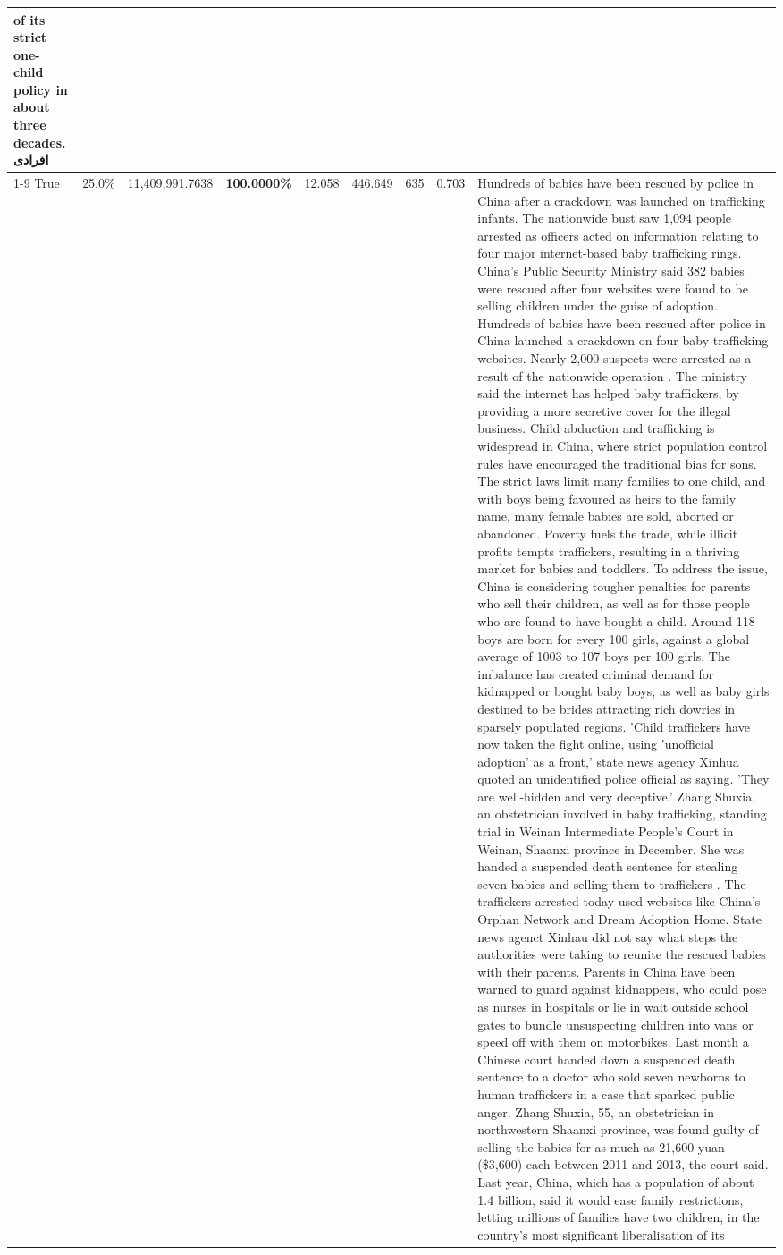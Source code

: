 \begin{table}[H]
\begin{tabular}{lllrlllll}
of its strict one-child policy in about three decades. افرادی \\
\cline{1-9}
True & 25.0\% & 11,409,991.7638 & \bfseries \color{red} 100.0000\% & 12.058 & 446.649 & 635 & 0.703 & Hundreds of babies have been rescued by police in China after a crackdown was launched on trafficking infants. The nationwide bust saw 1,094 people arrested as officers acted on information relating to four major internet-based baby trafficking rings. China's Public Security Ministry said 382 babies were rescued after four websites were found to be selling children under the guise of adoption. Hundreds of babies have been rescued after police in China launched a crackdown on four baby trafficking websites. Nearly 2,000 suspects were arrested as a result of the nationwide operation . The ministry said the internet has helped baby traffickers, by providing a more secretive cover for the illegal business. Child abduction and trafficking is widespread in China, where strict population control rules have encouraged the traditional bias for sons. The strict laws limit many families to one child, and with boys being favoured as heirs to the family name, many female babies are sold, aborted or abandoned. Poverty fuels the trade, while illicit profits tempts traffickers, resulting in a thriving market for babies and toddlers. To address the issue, China is considering tougher penalties for parents who sell their children, as well as for those people who are found to have bought a child. Around 118 boys are born for every 100 girls, against a global average of 1003 to 107 boys per 100 girls. The imbalance has created criminal demand for kidnapped or bought baby boys, as well as baby girls destined to be brides attracting rich dowries in sparsely populated regions. 'Child traffickers have now taken the fight online, using 'unofficial adoption' as a front,' state news agency Xinhua quoted an unidentified police official as saying. 'They are well-hidden and very deceptive.' Zhang Shuxia, an obstetrician involved in baby trafficking, standing trial in Weinan Intermediate People's Court in Weinan, Shaanxi province in December. She was handed a suspended death sentence for stealing seven babies and selling them to traffickers . The traffickers arrested today used websites like China's Orphan Network and Dream Adoption Home. State news agenct Xinhau did not say what steps the authorities were taking to reunite the rescued babies with their parents. Parents in China have been warned to guard against kidnappers, who could pose as nurses in hospitals or lie in wait outside school gates to bundle unsuspecting children into vans or speed off with them on motorbikes. Last month a Chinese court handed down a suspended death sentence to a doctor who sold seven newborns to human traffickers in a case that sparked public anger. Zhang Shuxia, 55, an obstetrician in northwestern Shaanxi province, was found guilty of selling the babies for as much as 21,600 yuan (\$3,600) each between 2011 and 2013, the court said. Last year, China, which has a population of about 1.4 billion, said it would ease family restrictions, letting millions of families have two children, in the country's most significant liberalisation of its 
\end{tabular}
\end{table}
